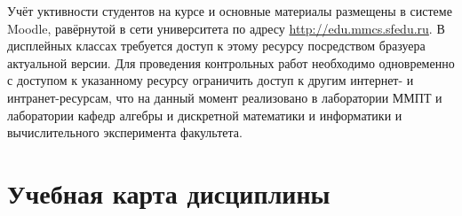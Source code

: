 
Учёт уктивности студентов на курсе и основные материалы размещены в системе Moodle, равёрнутой в сети университета по адресу \url{http://edu.mmcs.sfedu.ru}. В дисплейных классах требуется доступ к этому ресурсу посредством бразуера актуальной версии. Для проведения контрольных работ необходимо одновременно с доступом к указанному ресурсу ограничить доступ к другим интернет- и интранет-ресурсам, что на данный момент реализовано в лаборатории ММПТ и лаборатории кафедр алгебры и дискретной математики и информатики и вычислительного эксперимента факультета.

\section{Учебная карта дисциплины}



